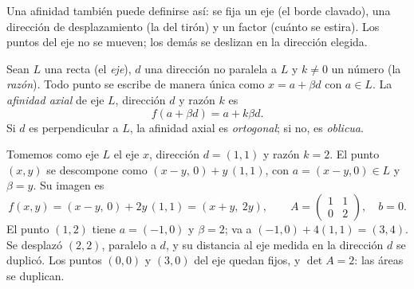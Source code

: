 Una afinidad también puede definirse así: se fija un eje (el borde clavado), una dirección de
desplazamiento (la del tirón) y un factor (cuánto se estira). Los puntos del eje no se mueven;
los demás se deslizan en la dirección elegida.

\begin{definicion}\label{def:06-axial}
Sean \(L\) una recta (el \emph{eje}), \(d\) una dirección no paralela a \(L\) y \(k\neq0\) un
número (la \emph{razón}). Todo punto se escribe de manera única como \(x=a+\beta d\) con
\(a\in L\). La \emph{afinidad axial} de eje \(L\), dirección \(d\) y razón \(k\) es
\[
  f(a+\beta d)=a+k\beta d .
\]
Si \(d\) es perpendicular a \(L\), la afinidad axial es \emph{ortogonal}; si no, es
\emph{oblicua}.
\end{definicion}

\begin{ejemplo}\label{ej:06-axial}
Tomemos como eje \(L\) el eje \(x\), dirección \(d=(1,1)\) y razón \(k=2\). El punto
\((x,y)\) se descompone como \((x-y,\,0)+y\,(1,1)\), con \(a=(x-y,0)\in L\) y \(\beta=y\). Su
imagen es
\[
  f(x,y)=(x-y,\,0)+2y\,(1,1)=(x+y,\ 2y),
  \qquad
  A=\begin{pmatrix}1&1\\0&2\end{pmatrix},\quad b=0 .
\]
El punto \((1,2)\) tiene \(a=(-1,0)\) y \(\beta=2\); va a \((-1,0)+4(1,1)=(3,4)\). Se desplazó
\((2,2)\), paralelo a \(d\), y su distancia al eje medida en la dirección \(d\) se duplicó. Los
puntos \((0,0)\) y \((3,0)\) del eje quedan fijos, y \(\det A=2\): las áreas se duplican.
\end{ejemplo}

\begin{center}
\end{center}

